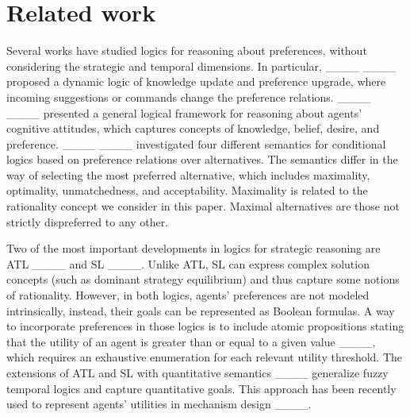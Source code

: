 \section{Related work}
\label{sec:relatedwork}


Several works have studied logics  for reasoning about preferences, without considering the strategic and temporal dimensions. In particular, ____ ____ proposed a dynamic logic of knowledge update and preference upgrade, where incoming suggestions or commands change the preference relations. ____ ____ presented a general logical framework for reasoning about agents’ cognitive
attitudes, which captures concepts of knowledge, belief, desire, and preference.  
____ ____ investigated four different semantics for conditional logics based on preference relations over alternatives. The semantics differ in the way of selecting the most preferred alternative, which includes maximality, optimality, unmatchedness, and acceptability. \ifarxiv Maximality is related to the rationality concept we consider in this paper. Maximal alternatives are those not strictly dispreferred to any other. \fi 

Two of the most important developments in logics for strategic reasoning are ATL ____ and SL ____.
Unlike ATL, SL can express complex solution concepts (such as dominant strategy equilibrium) and thus capture some notions of rationality.  
However, in both logics, agents' preferences are not modeled intrinsically, instead, their goals can be represented as Boolean formulas. 
A way to incorporate preferences in those logics is to include atomic propositions stating that the utility of an agent is greater than or equal to a given value ____, which requires an exhaustive enumeration for each relevant utility threshold.  
The extensions of ATL and SL with quantitative semantics ____ generalize fuzzy temporal logics and capture quantitative goals.  This approach has been recently used to represent agents' utilities in  mechanism design ____. 

